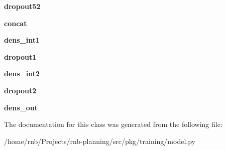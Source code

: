 \begin{DoxyCompactItemize}
{\bfseries dropout52}
\item 
\mbox{\label{classrnb-planning_1_1src_1_1pkg_1_1training_1_1model_1_1_res_net_model_t_p_ad15b3e498ca4884cd1f53d1c01b6676b}} 
{\bfseries concat}
\item 
\mbox{\label{classrnb-planning_1_1src_1_1pkg_1_1training_1_1model_1_1_res_net_model_t_p_a25e76315fcbe9f742910cad26add4696}} 
{\bfseries dens\+\_\+int1}
\item 
\mbox{\label{classrnb-planning_1_1src_1_1pkg_1_1training_1_1model_1_1_res_net_model_t_p_aed9d4146f8ead80a45ecf3d76e8a2ad8}} 
{\bfseries dropout1}
\item 
\mbox{\label{classrnb-planning_1_1src_1_1pkg_1_1training_1_1model_1_1_res_net_model_t_p_aa792fa84a0af3d47be6da264e8294593}} 
{\bfseries dens\+\_\+int2}
\item 
\mbox{\label{classrnb-planning_1_1src_1_1pkg_1_1training_1_1model_1_1_res_net_model_t_p_acaee9701a515a2ba13a3f917a629981a}} 
{\bfseries dropout2}
\item 
\mbox{\label{classrnb-planning_1_1src_1_1pkg_1_1training_1_1model_1_1_res_net_model_t_p_a3bfcca428c494f0f1a85a6955334c972}} 
{\bfseries dens\+\_\+out}
\end{DoxyCompactItemize}


The documentation for this class was generated from the following file\+:\begin{DoxyCompactItemize}
\item 
/home/rnb/\+Projects/rnb-\/planning/src/pkg/training/model.\+py\end{DoxyCompactItemize}
